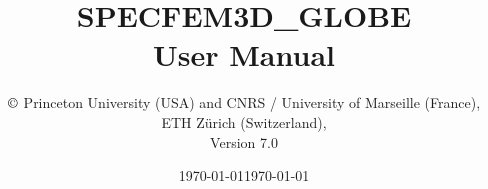 \documentclass[oneside,english]{book}
\date{\today}
\begin{document}

\thispagestyle{empty}
\begin{center}
\vspace*{-1.8truecm}
\noindent{}
\end{center}
%
\title{\thispagestyle{empty}\textbf{SPECFEM3D\_GLOBE}\\
\textbf{User Manual}}
%
\author{$\copyright$ Princeton University (USA) and CNRS / University of Marseille (France),\\
ETH Z\"urich (Switzerland),\\
Version 7.0}

\date{\noindent \today}

\maketitle
\end{document}
